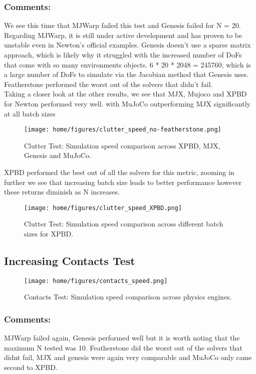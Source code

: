 \documentclass[11pt,a4paper]{article}
\begin{document}
\subsubsection{Comments:} We see this time that MJWarp failed this test and Genesis failed for N = 20. Regarding MJWarp, it is still under active development and has proven to be unstable even in Newton's official examples.
Genesis doesn't use a sparse matrix approach, which is likely why it struggled with the increased number of DoFs that come with so many environments objects. 6 * 20 * 2048 = 245760, which is a large number of DoFs to simulate via the Jacobian method that Genesis uses. \\
Featherstone performed the worst out of the solvers that didn't fail. \\
Taking a closer look at the other results, we see that MJX, Mujoco and XPBD for Newton performed very well. with MuJoCo outperforming MJX significantly at all batch sizes
\begin{figure}[H]
    \centering
    \texttt{[image: home/figures/clutter\_speed\_no-featherstone.png]}
    \caption{Clutter Test: Simulation speed comparison across XPBD, MJX, Genesis and MuJoCo.}
    \label{fig:clutter_speed_comparison}
\end{figure}
\noindent XPBD performed the best out of all the solvers for this metric, zooming in further we see that increasing batch size leads to better performance however these returns diminish as N increases.
\begin{figure}[H]
    \centering
    \texttt{[image: home/figures/clutter\_speed\_XPBD.png]}
    \caption{Clutter Test: Simulation speed comparison across different batch sizes for XPBD.}
    \label{fig:clutter_speed_comparison}
\end{figure}

\subsection{Increasing Contacts Test}
\begin{figure}[H]
    \centering
    \texttt{[image: home/figures/contacts\_speed.png]}
    \caption{Contacts Test: Simulation speed comparison across physics engines.}
    \label{fig:contacts_speed_comparison}
\end{figure}

\subsubsection{Comments:}
MJWarp failed again, Genesis performed well but it is worth noting that the maximum N tested was 10. Featherstone did the worst out of the solvers that didnt fail, MJX and genesis were again very comparable and MuJoCo only came second to XPBD.
\end{document}
